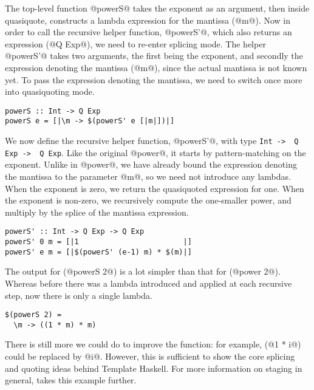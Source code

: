 The top-level function @powerS@ takes the exponent as an argument, then inside quasiquote, constructs a lambda expression for the mantissa (@m@).
Now in order to call the recursive helper function, @powerS'@, which also returns an expression (@Q Exp@), we need to re-enter splicing mode.
The helper @powerS'@ takes two arguments, the first being the exponent, and secondly the expression denoting the mantissa (@m@), since the actual mantissa is not known yet.
To pass the expression denoting the mantissa, we need to switch once more into quasiquoting mode.

\begin{lstlisting}
powerS :: Int -> Q Exp
powerS e = [|\m -> $(powerS' e [|m|])|]
\end{lstlisting}

We now define the recursive helper function, @powerS'@, with type \lstinline/Int ->  Q Exp ->  Q Exp/.
Like the original @power@, it starts by pattern-matching on the exponent.
Unlike in @power@, we have already bound the expression denoting the mantissa to the parameter @m@, so we need not introduce any lambdas.
When the exponent is zero, we return the quasiquoted expression for one.
When the exponent is non-zero, we recursively compute the one-smaller power, and multiply by the splice of the mantissa expression.

\begin{lstlisting}
powerS' :: Int -> Q Exp -> Q Exp
powerS' 0 m = [|1                        |]
powerS' e m = [|$(powerS' (e-1) m) * $(m)|]
\end{lstlisting}


The output for (@powerS 2@) is a lot simpler than that for (@power 2@).
Whereas before there was a lambda introduced and applied at each recursive step, now there is only a single lambda.

\begin{lstlisting}
$(powerS 2) =
  \m -> ((1 * m) * m)
\end{lstlisting}

There is still more we could do to improve the function: for example, (@1 * i@) could be replaced by @i@.
However, this is sufficient to show the core splicing and quoting ideas behind Template Haskell.
For more information on staging in general, \citet{rompf2010lightweight} takes this example further.

